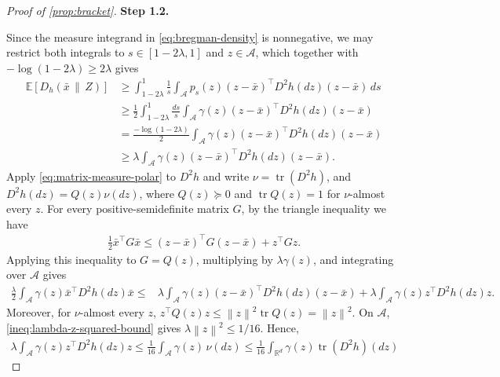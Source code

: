 \documentclass[11pt]{article}
\newcommand{\proofstepinline}[1]{%
    {\sffamily\bfseries\color{blue!55!black}Step #1.}\enspace
}
\newcommand{\R}{\mathbb R}
\newcommand{\E}{\mathbb E}
\newcommand{\tr}{\operatorname{tr}}
\newcommand{\1}{\mathbf 1}
\newcommand{\norm}[1]{\left\lVert #1\right\rVert}
\begin{document}
\begin{proof}[Proof of \cref{prop:bracket}]
    \proofstepinline{1.2}
    Since the measure integrand in \eqref{eq:bregman-density} is
    nonnegative, we may restrict both integrals to
    $s\in[1-2\lambda,1]$ and $z\in\mathcal A$,
    which together with $-\log(1-2\lambda)\geq2\lambda$ gives
    \begin{align}
        \E[D_h(\bar{x}\,\|\,Z)]
         & \geq
        \int_{1-2\lambda}^1\frac1s
        \int_{\mathcal A}
        p_s(z)(z-\bar{x})^\top D^2h(dz)(z-\bar{x})\,ds
        \\
         & \geq
        \frac12
        \int_{1-2\lambda}^1\frac{ds}{s}
        \int_{\mathcal A}
        \gamma(z)(z-\bar{x})^\top D^2h(dz)(z-\bar{x})
        \\
         & =
        \frac{-\log(1-2\lambda)}{2}
        \int_{\mathcal A}
        \gamma(z)(z-\bar{x})^\top D^2h(dz)(z-\bar{x})
        \\
         & \geq
        \lambda
        \int_{\mathcal A}
        \gamma(z)(z-\bar{x})^\top D^2h(dz)(z-\bar{x}).
        \label{eq:bregman-lower}
    \end{align}
    Apply \eqref{eq:matrix-measure-polar} to $D^2h$ and write
    $\nu=\tr(D^2h)$, and $D^2h(dz)=Q(z)\nu(dz)$,
    where $Q(z)\succeq0$ and $\tr Q(z)=1$ for $\nu$-almost every $z$.
    For every positive-semidefinite matrix $G$, by the triangle inequality we have
    \begin{align}
        \frac12\bar{x}^\top G\bar{x}
        \leq
        (z-\bar{x})^\top G(z-\bar{x})+z^\top Gz.
    \end{align}
    Applying this inequality to $G=Q(z)$, multiplying by
    $\lambda\gamma(z)$, and integrating over $\mathcal A$ gives
    \begin{align}
        \frac\lambda2
        \int_{\mathcal A}
        \gamma(z)\bar{x}^\top D^2h(dz)\bar{x}
        \leq{} &
        \lambda
        \int_{\mathcal A}
        \gamma(z)(z-\bar{x})^\top D^2h(dz)(z-\bar{x})
        +
        \lambda
        \int_{\mathcal A}
        \gamma(z)z^\top D^2h(dz)z.
    \end{align}
    Moreover, for $\nu$-almost every $z$,
    $z^\top Q(z)z
        \leq
        \norm{z}^2\tr Q(z)
        =
        \norm{z}^2.$
    On $\mathcal A$, \eqref{ineq:lambda-z-squared-bound} gives $\lambda\norm{z}^2\leq1/16$.
    Hence,
    \begin{align}
        \lambda
        \int_{\mathcal A}
        \gamma(z)z^\top D^2h(dz)z
        \leq
        \frac1{16}
        \int_{\mathcal A}\gamma(z)\,\nu(dz)
        \leq
        \frac1{16}
        \int_{\R^d}\gamma(z)\tr(D^2h)(dz)

\end{align}
\end{proof}
\end{document}
